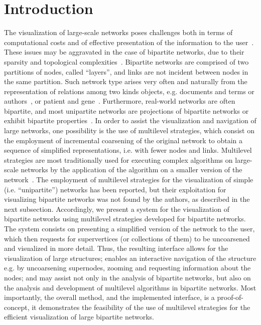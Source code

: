 \documentclass[runningheads]{llncs}
\begin{document}
\section{Introduction}
The visualization of large-scale networks poses challenges both in terms of computational costs
and of effective presentation of the information to the user~\cite{tang,staudt}.
These issues may be aggravated in the case of bipartite networks,
due to their sparsity and topological complexities~\cite{alan1}.
Bipartite networks are comprised of two partitions of nodes,
called ``layers'',
and links are not incident between nodes in the same partition.
Such network type arises very often and naturally from the representation
of relations among two kinds objects,
e.g. documents and terms or authors~\cite{doc,sci,movie}, or patient and gene~\cite{gene}.
Furthermore, real-world networks are often bipartite, and most unipartite networks
are projections of bipartite networks or exhibit bipartite properties~\cite{guillaume0,guillaume}.
In order to assist the visualization and navigation of large networks, one possibility is the use of
multilevel strategies, which consist on the employment of incremental coarsening of the original
network to obtain a sequence of simplified representations, i.e. with fewer nodes and links.
Multilevel strategies are most traditionally used for executing complex algorithms
on large-scale networks by the application of the algorithm on a smaller
version of the network~\cite{alan2,ml2}.
The employment of multilevel strategies for the visualization of simple (i.e. ``unipartite'')
networks has been reported, but their exploitation for visualizing bipartite networks
was not found by the authors, as described in the next subsection.
Accordingly, we present a system for the visualization of bipartite networks using
multilevel strategies developed for bipartite networks.
The system consists on presenting a simplified version of the network to the user, which then
requests for supervertices (or collections of them) to be uncoarsened and visualized in more detail.
Thus, the resulting interface allows for the visualization of large structures;
enables an interactive navigation of the structure e.g. by uncoarsening supernodes, zooming and requesting information about the nodes;
and may assist not only in the analysis of bipartite networks, but also on the analysis and development of multilevel algorithms in bipartite networks.
Most importantly, the overall method, and the implemented interface, is a proof-of-concept, it demonstrates the feasibility of the use of multilevel strategies for the efficient visualization of large bipartite networks.
\end{document}
